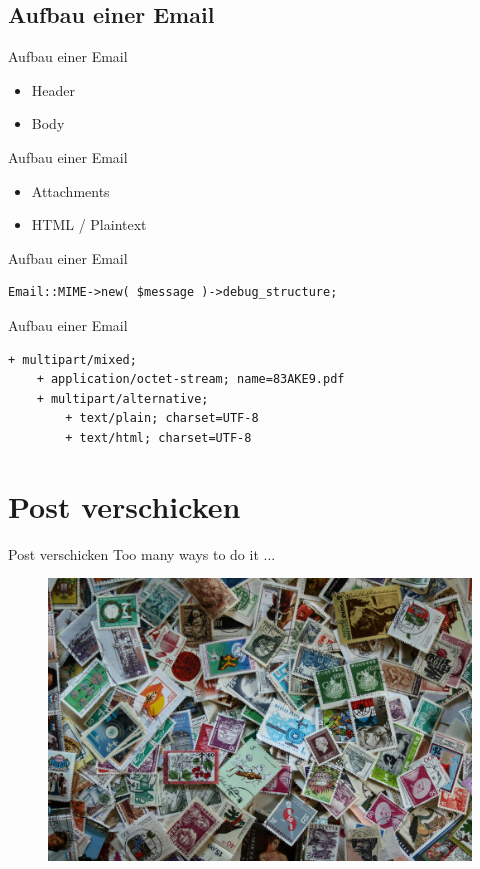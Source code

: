 \subsection{Aufbau einer Email}

\begin{frame}{Aufbau einer Email}
  \begin{itemize}
  \item Header
  \item Body
  \end{itemize}
\end{frame}

\begin{frame}{Aufbau einer Email}
  \begin{itemize}
  \item Attachments
  \item HTML / Plaintext
  \end{itemize}
\end{frame}

\begin{frame}[fragile]{Aufbau einer Email}
\begin{verbatim}
Email::MIME->new( $message )->debug_structure;
\end{verbatim}
\end{frame}

\begin{frame}[fragile]{Aufbau einer Email}
\begin{lstlisting}
+ multipart/mixed;
    + application/octet-stream; name=83AKE9.pdf
    + multipart/alternative;
        + text/plain; charset=UTF-8
        + text/html; charset=UTF-8
\end{lstlisting}
\end{frame}

\section{Post verschicken}

\begin{frame}{Post verschicken}
  Too many ways to do it ...
  \begin{figure}[!ht]
    \centering
    \includegraphics[width=0.9\linewidth]{img/wealth-3262562_1920.jpg}
  \end{figure}
\end{frame}

